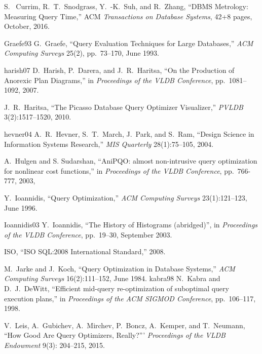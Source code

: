 \documentclass[prodmode,acmtods]{acmsmall}
\begin{document}
{\begin{thebibliography}{99}
S.~ Currim, R.~T.~Snodgrass, Y.~-K.~Suh, and R.~Zhang,
``DBMS Metrology: Measuring Query Time,'' ACM {\em Transactions
on Database Systems}, 42+8 pages, October, 2016.

\bibitem
{Graefe93}
G.~Graefe, ``Query Evaluation Techniques for Large Databases,'' {\em ACM
  Computing Surveys} 25(2), pp.~73--170, June 1993.

\bibitem
{harish07}
D.~Harish, P.~Darera, and J.~R.~Haritsa, ``On the Production of Anorexic
Plan Diagrams,'' in {\em Proceedings of the VLDB Conference},
pp.~1081--1092, 2007.

J.~R.~Haritsa, ``The Picasso Database Query Optimizer Visualizer,'' {\em
  PVLDB} 3(2):1517--1520, 2010.

\bibitem
{hevner04}
A.~R.~Hevner, S.~T.~March, J.~Park, and S.~Ram, ``Design Science in
Information Systems Research,'' {\em MIS Quarterly} 28(1):75--105, 2004.

A.~Hulgen and S. Sudarshan, ``AniPQO: almost non-intrusive query optimization
for nonlinear cost functions,'' in {\em Proceedings of the VLDB Conference},
pp.~766-777, 2003,

Y.~Ioannidis, ``Query Optimization,'' {\em ACM Computing Surveys}
23(1):121--123, June 1996.

\bibitem
{Ioannidis03}
Y.~Ioannidis, ``The History of Histograms (abridged)'', in {\em Proceedings
  of the VLDB Conference}, pp.~19--30, September 2003.

ISO, ``ISO SQL:2008 International Standard,'' 2008.

M.~Jarke and J.~Koch, ``Query Optimization in Database Systems,'' {\em ACM
  Computing Surveys} 16(2):111--152, June 1984.
\bibitem
{kabra98}
N.~Kabra and D.~J.~DeWitt, ``Efficient mid-query re-optimization of
suboptimal query execution plans,'' in {\em Proceedings of the ACM SIGMOD Conference}, pp.~106--117, 1998.

V.~Leis, A.~Gubichev, A.~Mirchev, P.~Boncz, A.~Kemper, and T.~Neumann, ``How
Good Are Query Optimizers, Really?''' {\em Proceedings of the VLDB
  Endowment} 9(3): 204--215, 2015.


\end{thebibliography}}
\end{document}
